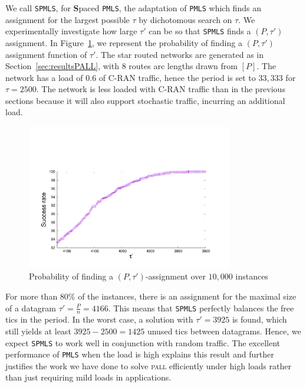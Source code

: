 \documentclass[a4paper,10pt]{journal}
\newcommand\PMLS{\texttt{PMLS}\xspace}
\newcommand\SPMLS{\texttt{SPMLS}\xspace}
\newcommand\pall{\textsc{pall}\xspace}
\begin{document}
    We call \SPMLS, for \textbf{S}paced \PMLS, the adaptation of \PMLS which finds an assignment for the largest possible $\tau$ by dichotomous search on $\tau$. We experimentally investigate how large $\tau'$ can be so that \SPMLS finds a $(P,\tau')$ assignment. In Figure~\ref{fig:spacetau}, we represent the probability of finding a $(P,\tau')$ assignment function of $\tau'$. The star routed networks are generated as in Section~\ref{sec:resultsPALL}, with $8$ routes arc lengths drawn from $[P]$. The network has a load of $0.6$ of C-RAN traffic, hence the period is set to $33,333$ for $\tau = 2500$. The network is less loaded with C-RAN traffic than in the previous sections because it will also support stochastic traffic, incurring an additional load.

    \begin{figure}
       \begin{center}
      \includegraphics[width = 0.8\textwidth]{distribtau.pdf}
      \end{center}
      \caption{Probability of finding a $(P,\tau')$-assignment over $10,000$ instances}
      \label{fig:spacetau}   
     \end{figure}   

	For more than $80\%$ of the instances, there is an assignment for the maximal size of a datagram $\tau' = \frac{P}{n} = 4166$. This means that \SPMLS perfectly balances the free tics in the period. In the worst case, a solution with $\tau' = 3925$ is found, which still yields at least $3925 - 2500 = 1425$ unused tics between datagrams. Hence, we expect \SPMLS to work well in conjunction with random traffic. The excellent performance of \PMLS when the load is high explains this result and further justifies the work we have done to solve \pall efficiently under high loads rather than just requiring mild loads in applications. 
\end{document}
